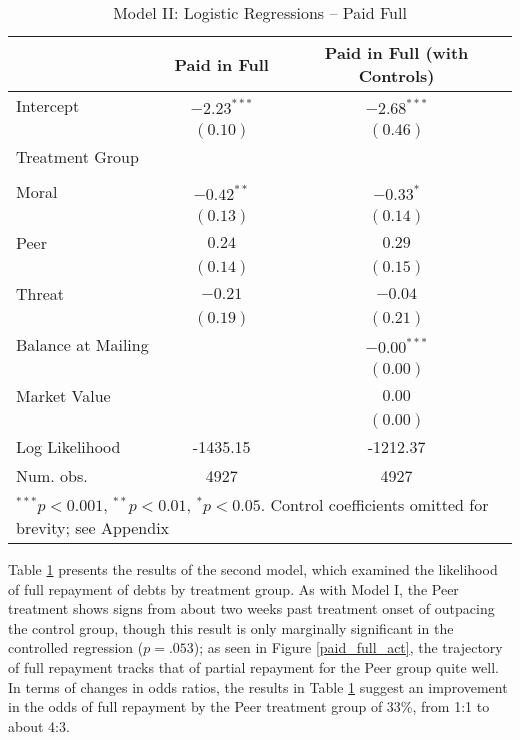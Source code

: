 \documentclass[12pt,titlepage]{article}
\begin{document}
\begin{table}[htbp]
\begin{center}
\begin{tabular}{l c c }
\hline
                   & Paid in Full & Paid in Full (with Controls) \\
\hline
Intercept          & $-2.23^{***}$ & $-2.68^{***}$ \\
                   & $(0.10)$      & $(0.46)$      \\
Treatment Group    &               &               \\
                   &               &               \\
\quad Moral        & $-0.42^{**}$  & $-0.33^{*}$   \\
                   & $(0.13)$      & $(0.14)$      \\
\quad Peer         & $0.24$        & $0.29$        \\
                   & $(0.14)$      & $(0.15)$      \\
\quad Threat       & $-0.21$       & $-0.04$       \\
                   & $(0.19)$      & $(0.21)$      \\
Balance at Mailing &               & $-0.00^{***}$ \\
                   &               & $(0.00)$      \\
Market Value       &               & $0.00$        \\
                   &               & $(0.00)$      \\
\hline
Log Likelihood     & -1435.15      & -1212.37      \\
Num. obs.          & 4927          & 4927          \\
\hline
\multicolumn{3}{l}{\scriptsize{$^{***}p<0.001$, $^{**}p<0.01$, $^*p<0.05$. Control coefficients omitted for brevity; see Appendix}}
\end{tabular}
\caption{Model II: Logistic Regressions -- Paid Full}
\label{table:modelII}
\end{center}
\end{table}

Table \ref{table:modelII} presents the results of the second model,
which examined the likelihood of full repayment of debts by treatment
group. As with Model I, the Peer treatment shows signs from about two
weeks past treatment onset of outpacing the control group, though this
result is only marginally significant in the controlled regression ($p=.053$); as seen in
Figure \ref{paid_full_act}, the trajectory of full repayment tracks
that of partial repayment for the Peer group quite well. In terms
of changes in odds ratios, the results in Table \ref{table:modelII}
suggest an improvement in the odds of full repayment by the Peer
treatment group of 33\%, from 1:1 to about 4:3. 
\end{document}
